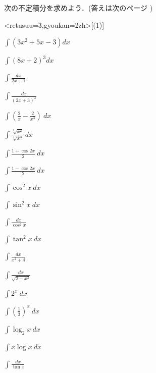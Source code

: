 \documentclass[10pt, uplatex, dvipdfmx]{jsarticle}
\theoremstyle{definition}
\numberwithin{equation}{section}
\newcommand{\ds}{\displaystyle}
\begin{document}
次の不定積分を求めよう．(答えは次のページ )


\vspace{2zh}

\begin{edaenumerate}<retusuu=3,gyoukan=2zh>[(1)]
  
  
\item $\ds \int \left( 3x^2+5x-3 \right) dx$
  
\item $\ds \int \left(8x+2 \right)^3 dx$

\item $\ds \int \frac{dx}{2x+1}$

\item $\ds \int \frac{dx}{(2x+3)^3}$
  
\item $\ds \int \left(\frac{2}{x} - \frac{2}{x^3}\right) \ dx $
  
\item $\ds \int\frac{\sqrt[3]{x^2}}{\sqrt[5]{x^3}} \ dx$
  
\item $\ds \int \frac{1+\cos 2x}{2} \ dx$

\item $\ds \int \frac{1-\cos 2x}{2} \ dx$
 
\item $\ds \int \cos^2 x \ dx$
 
\item $\ds \int \sin^2 x \ dx$
    
\item $\ds \int \frac{dx}{\cos^2 x}$
  
\item $\ds \int \tan^2 x \ dx$
  
\item $\ds \int \frac{dx}{x^2+4}$
  
\item $\ds \int \frac{dx}{\sqrt{2-x^2}}$
  
\item $\ds \int 2^x \ dx$

\item $\ds \int \left( \frac{1}{3} \right)^x \ dx$

\item $\ds \int \log_{2} x \ dx$

\item $\ds \int x \log x \ dx$

\item $\ds \int \frac{dx}{\tan x}$


\end{edaenumerate}
\end{document}
